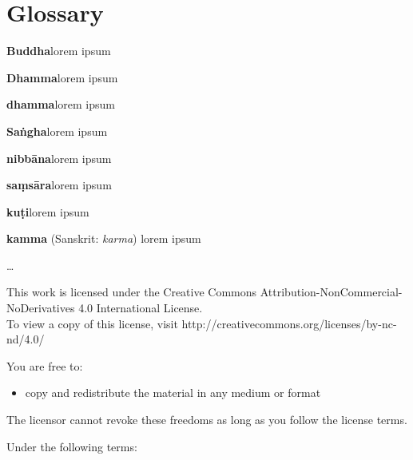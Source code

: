 \documentclass[11pt,openany]{memoir}
\begin{document}




\chapter*{Glossary}
\parindent 0pt
\parskip 4pt

\textbf{Buddha}\hspace{9pt}lorem ipsum

\textbf{Dhamma}\hspace{9pt}lorem ipsum

\textbf{dhamma}\hspace{9pt}lorem ipsum

\textbf{Saṅgha}\hspace{9pt}lorem ipsum

\textbf{nibbāna}\hspace{9pt}lorem ipsum

\textbf{saṃsāra}\hspace{9pt}lorem ipsum

\textbf{kuṭi}\hspace{9pt}lorem ipsum

\textbf{kamma}\hspace{9pt} (Sanskrit: \emph{karma}) lorem ipsum

\ldots{}

\clearpage
\mbox{}
\clearpage
\footnotesize
\begin{center}
This work is licensed under the Creative Commons
Attribution-NonCommercial-NoDerivatives 4.0 International License.\\To
view a copy of this license, visit
http://creativecommons.org/licenses/by-nc-nd/4.0/
\end{center}

You are free to:

\begin{itemize}
\item copy and redistribute the material in any medium or format 
\end{itemize}


The licensor cannot revoke these freedoms as long as you follow the
license terms.

Under the following terms:
\end{document}
